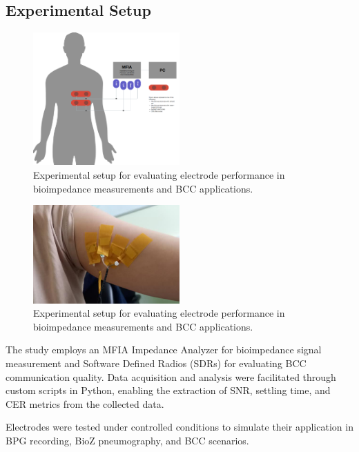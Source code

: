 \documentclass[conference]{IEEEtran}
\begin{document}
\subsection{Experimental Setup}
\begin{figure}[!ht]
    \centering
    \includegraphics[width=0.5\textwidth]{figures/experimentSetup.png}
    \caption{Experimental setup for evaluating electrode performance in bioimpedance measurements and BCC applications.}
    \label{fig:experimental_setup}
\end{figure}

\begin{figure}
    \centering
    \includegraphics[width=0.5\textwidth]{figures/experimentSetup_upper_arm.png}
    \caption{Experimental setup for evaluating electrode performance in bioimpedance measurements and BCC applications.}
    \label{fig:experimental_setup_upper_arm}
\end{figure}

The study employs an MFIA Impedance Analyzer for bioimpedance signal measurement and Software Defined Radios (SDRs) for evaluating BCC communication quality. Data acquisition and analysis were facilitated through custom scripts in Python, enabling the extraction of SNR, settling time, and CER metrics from the collected data.

Electrodes were tested under controlled conditions to simulate their application in BPG recording, BioZ pneumography, and BCC scenarios.
\end{document}
